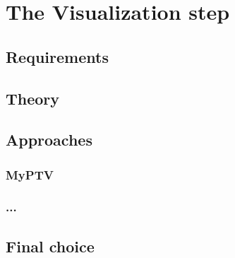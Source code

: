 \chapter{The Visualization step}
\label{chap:visual}

\section{Requirements}
\section{Theory}
\section{Approaches}
\subsection{MyPTV}
\subsection{...}
\section{Final choice}
